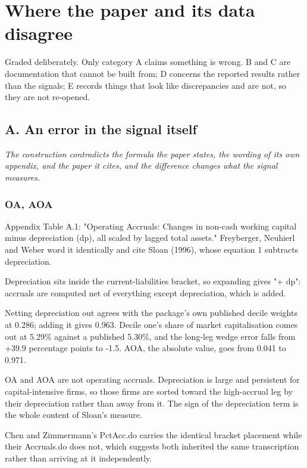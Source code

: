 \documentclass[11pt]{article}
\begin{document}
\clearpage
\section*{Where the paper and its data disagree}
Graded deliberately. Only category A claims something is wrong. B and C are documentation that cannot be built from; D concerns the reported results rather than the signals; E records things that look like discrepancies and are not, so they are not re-opened.
\subsection*{A. An error in the signal itself}
\emph{The construction contradicts the formula the paper states, the wording of its own appendix, and the paper it cites, and the difference changes what the signal measures.}

\subsubsection*{OA, AOA}
\begin{description}[leftmargin=2.4cm,labelwidth=2.2cm,font=\normalfont\bfseries,style=sameline]
\item[Documented:] Appendix Table A.1: "Operating Accruals: Changes in non-cash working capital minus depreciation (dp), all scaled by lagged total assets." Freyberger, Neuhierl and Weber word it identically and cite Sloan (1996), whose equation 1 subtracts depreciation.
\item[Implemented:] Depreciation sits inside the current-liabilities bracket, so expanding gives "+ dp": accruals are computed net of everything except depreciation, which is added.
\item[Evidence:] Netting depreciation out agrees with the package's own published decile weights at 0.286; adding it gives 0.963. Decile one's share of market capitalisation comes out at 5.29\% against a published 5.30\%, and the long-leg wedge error falls from +39.9 percentage points to -1.5. AOA, the absolute value, goes from 0.041 to 0.971.
\item[Why it matters:] OA and AOA are not operating accruals. Depreciation is large and persistent for capital-intensive firms, so those firms are sorted toward the high-accrual leg by their depreciation rather than away from it. The sign of the depreciation term is the whole content of Sloan's measure.
\item[Note:] Chen and Zimmermann's PctAcc.do carries the identical bracket placement while their Accruals.do does not, which suggests both inherited the same transcription rather than arriving at it independently.
\end{description}
\end{document}
